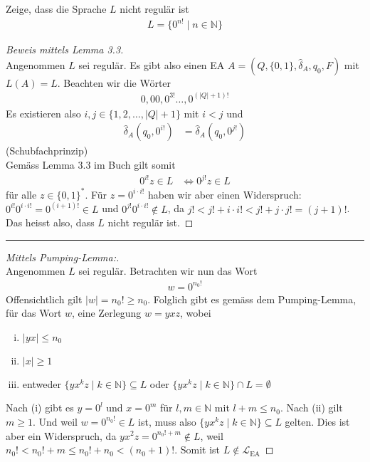 \documentclass[a4paper,ngerman,12pt]{exam}
\begin{document}
\begin{questions}
\question
   Zeige, dass die Sprache $L$ nicht regulär ist
    \begin{align*}
      L = \{0^{n!} \mid n \in \mathbb{N}\}
    \end{align*}
     \vspace{-2em}
    \begin{solutionorbox}[22em]
      \begin{proof}[Beweis mittels Lemma 3.3] $ $\\
    Angenommen $L$ sei regulär.
    Es gibt also einen EA $A = (Q, \{0, 1\}, \hat{\delta}_A, q_0, F)$ mit $L(A) = L$.
    Beachten wir die Wörter
    \begin{align*}
      0, 00, 0^{3!}\dots , 0^{(|Q|+1)!}
    \end{align*}
    Es existieren also $i, j \in \{1, 2, \dots, |Q|+1\}$ mit $i < j$
    und
    \begin{align*}
      \hat{\delta}_A(q_0, 0^{i!}) &= \hat{\delta}_A(q_0, 0^{j!})
    \end{align*}
    (Schubfachprinzip)\\
    Gemäss Lemma 3.3 im Buch gilt somit
    \begin{align*}
      0^{i!} z \in L &\iff 0^{j!} z \in L
    \end{align*}
    für alle $z \in \{0, 1\}^*$. Für $z = 0^{i\cdot i!}$ haben wir aber einen Widerspruch:
    $0^{i!} 0^{i\cdot i!} = 0^{(i+1)!} \in L$ und $0^{j!} 0^{i\cdot i!} \not\in L$,
    da $j! < j! + i\cdot i! < j! + j\cdot j! = (j+1)!$.
    Das heisst also, dass
    $L$ nicht regulär ist.
      \end{proof}

      \hrule

      \begin{proof}[Mittels Pumping-Lemma:] $ $\\
        Angenommen $L$ sei regulär. Betrachten wir nun das Wort
        \begin{align*}
          w = 0^{n_0!}
        \end{align*}
        Offensichtlich gilt $|w| = n_0! \geq n_0$.
        Folglich gibt es gemäss dem Pumping-Lemma, für das Wort $w$, eine Zerlegung
        $w = yxz$, wobei
        \begin{enumerate}[(i)]
          \item $|yx| \leq n_0$
          \item $|x| \geq 1$
          \item entweder $\{y x^k z \mid k \in \mathbb{N}\} \subseteq L$
            oder $\{y x^k z \mid k \in \mathbb{N}\} \cap L = \emptyset$
        \end{enumerate}
        Nach (i) gibt es $y = 0^l$ und $x = 0^m$ für $l,m \in \mathbb{N}$
        mit $l+m \leq n_0$. Nach (ii) gilt $m \geq 1$. Und weil
        $w = 0^{n_0!} \in L$ ist, muss also
        $\{y x^k z \mid k \in \mathbb{N}\} \subseteq L$ gelten. Dies ist aber ein
        Widerspruch, da $yx^2z = 0^{n_0!+m} \not\in L$, weil
        $n_0! < n_0! + m \leq n_0! + n_0 < (n_0+1)!$.
        Somit ist
        $L \not\in \mathcal{L}_{\mathrm{EA}}$
      \end{proof}


\end{solutionorbox}
\end{questions}
\end{document}
